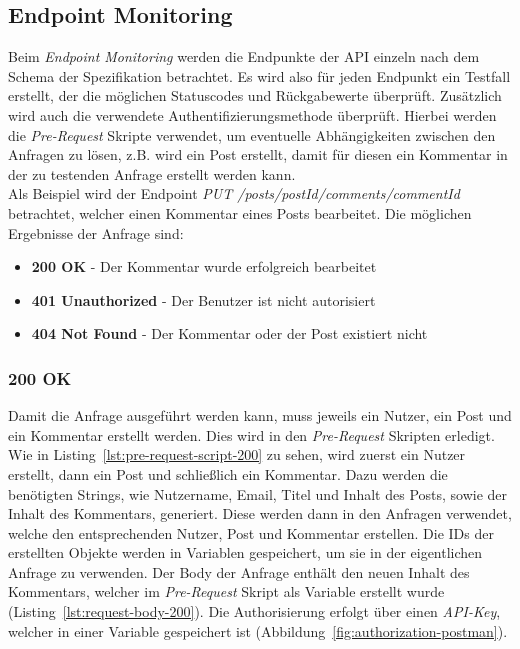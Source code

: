 \subsection{Endpoint Monitoring}

Beim \textit{Endpoint Monitoring} werden die Endpunkte der \ac{API} einzeln nach dem Schema der Spezifikation betrachtet. Es wird also für 
jeden Endpunkt ein Testfall erstellt, der die möglichen Statuscodes und Rückgabewerte überprüft. Zusätzlich wird auch die verwendete Authentifizierungsmethode überprüft.
Hierbei werden die \textit{Pre-Request} Skripte verwendet, um eventuelle Abhängigkeiten zwischen den Anfragen zu lösen, z.B. wird ein Post erstellt, 
damit für diesen ein Kommentar in der zu testenden Anfrage erstellt werden kann. \\
Als Beispiel wird der Endpoint \textit{PUT /posts/{{postId}}/comments/{{commentId}}} betrachtet, welcher einen Kommentar eines Posts bearbeitet.
Die möglichen Ergebnisse der Anfrage sind:
\begin{itemize}
    \item \textbf{200 OK} - Der Kommentar wurde erfolgreich bearbeitet
    \item \textbf{401 Unauthorized} - Der Benutzer ist nicht autorisiert
    \item \textbf{404 Not Found} - Der Kommentar oder der Post existiert nicht
\end{itemize}

\subsubsection*{200 OK}

Damit die Anfrage ausgeführt werden kann, muss jeweils ein Nutzer, ein Post und ein Kommentar erstellt werden. Dies wird in den \textit{Pre-Request} Skripten erledigt.
Wie in Listing~\ref{lst:pre-request-script-200} zu sehen, wird zuerst ein Nutzer erstellt, dann ein Post und schließlich ein Kommentar. Dazu werden die
benötigten Strings, wie Nutzername, Email, Titel und Inhalt des Posts, sowie der Inhalt des Kommentars, generiert. Diese werden dann in den Anfragen verwendet, welche 
den entsprechenden Nutzer, Post und Kommentar erstellen. Die IDs der erstellten Objekte werden in Variablen gespeichert, um sie in der eigentlichen Anfrage zu verwenden. 
Der Body der Anfrage enthält den neuen Inhalt des Kommentars, welcher im \textit{Pre-Request} Skript als Variable erstellt wurde (Listing~\ref{lst:request-body-200}). Die Authorisierung erfolgt über einen \textit{\ac{API}-Key}, welcher in einer Variable
gespeichert ist (Abbildung~\ref{fig:authorization-postman}).

